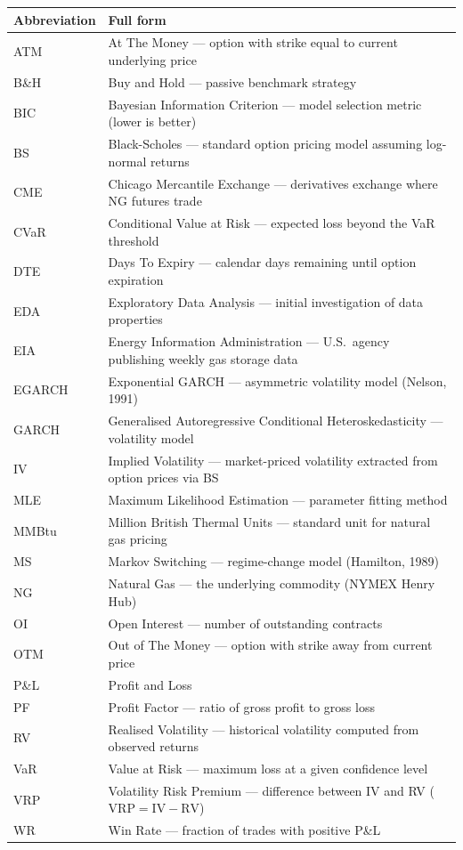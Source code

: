\documentclass[11pt,a4paper]{article}
\begin{document}
\begin{tabularx}{\textwidth}{lX}
\toprule
Abbreviation & Full form \\
\midrule
ATM & At The Money — option with strike equal to current underlying price \\
B\&H & Buy and Hold — passive benchmark strategy \\
BIC & Bayesian Information Criterion — model selection metric (lower is better) \\
BS & Black-Scholes — standard option pricing model assuming log-normal returns \\
CME & Chicago Mercantile Exchange — derivatives exchange where NG futures trade \\
CVaR & Conditional Value at Risk — expected loss beyond the VaR threshold \\
DTE & Days To Expiry — calendar days remaining until option expiration \\
EDA & Exploratory Data Analysis — initial investigation of data properties \\
EIA & Energy Information Administration — U.S.\ agency publishing weekly gas storage data \\
EGARCH & Exponential GARCH — asymmetric volatility model (Nelson, 1991) \\
GARCH & Generalised Autoregressive Conditional Heteroskedasticity — volatility model \\
IV & Implied Volatility — market-priced volatility extracted from option prices via BS \\
MLE & Maximum Likelihood Estimation — parameter fitting method \\
MMBtu & Million British Thermal Units — standard unit for natural gas pricing \\
MS & Markov Switching — regime-change model (Hamilton, 1989) \\
NG & Natural Gas — the underlying commodity (NYMEX Henry Hub) \\
OI & Open Interest — number of outstanding contracts \\
OTM & Out of The Money — option with strike away from current price \\
P\&L & Profit and Loss \\
PF & Profit Factor — ratio of gross profit to gross loss \\
RV & Realised Volatility — historical volatility computed from observed returns \\
VaR & Value at Risk — maximum loss at a given confidence level \\
VRP & Volatility Risk Premium — difference between IV and RV ($\text{VRP} = \text{IV} - \text{RV}$) \\
WR & Win Rate — fraction of trades with positive P\&L \\
\bottomrule
\end{tabularx}
\end{document}
